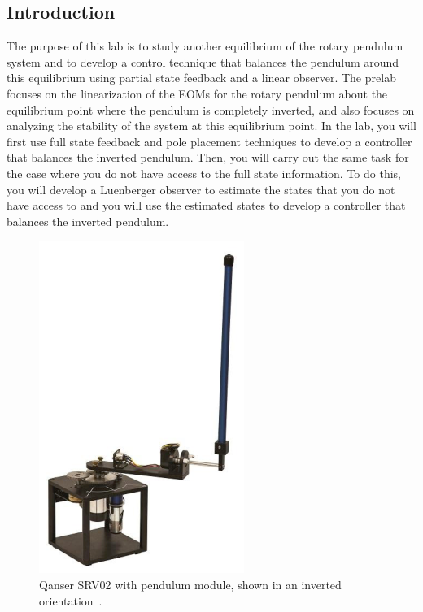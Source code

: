 \documentclass[12pt]{report}
\begin{document}
\subsection{Introduction}\label{subsection:lab3_intro}
The purpose of this lab is to study another equilibrium of the rotary pendulum system and to develop a control technique that balances the pendulum around this equilibrium using partial state feedback and a linear observer. The prelab focuses on the linearization of the EOMs for the rotary pendulum about the equilibrium point where the pendulum is completely inverted, and also focuses on analyzing the stability of the system at this equilibrium point. In the lab, you will first use full state feedback and pole placement techniques to develop a controller that balances the inverted pendulum. Then, you will carry out the same task for the case where you do not have access to the full state information. To do this, you will develop a Luenberger observer to estimate the states that you do not have access to and you will use the estimated states to develop a controller that balances the inverted pendulum.
\begin{figure}[htb!]
    \centering
    \includegraphics[width=.3\linewidth]{eps/lab_3/quanser.eps}
    \caption{Qanser SRV02 with pendulum module, shown in an inverted orientation~\cite{Q-Flex-Beam}.}
    \label{fig:lab3_plant}
\end{figure}
\end{document}
